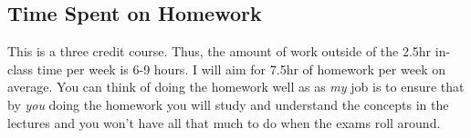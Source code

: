 \subsection*{Time Spent on Homework }

This is a three credit course. Thus, the amount of work outside of the 2.5hr in-class time per week is 6-9 hours. I will aim for 7.5hr of homework per week on average. You can think of doing the homework well as  as \emph{my} job is to ensure that by \emph{you} doing the homework you will study and understand the concepts in the lectures and you won't have all that much to do when the exams roll around.
